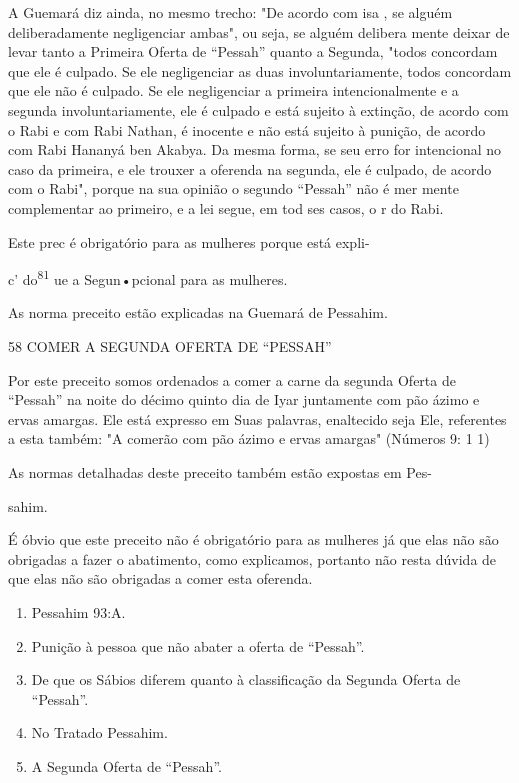 A Guemará diz ainda, no mesmo trecho: "De acordo com isa , se alguém
deliberadamente negligenciar ambas", ou seja, se alguém delibera mente
deixar de levar tanto a Primeira Oferta de ``Pessah'' quanto a Segunda,
"todos concordam que ele é culpado. Se ele negligenciar as duas
involuntaria­mente, todos concordam que ele não é culpado. Se ele
negligenciar a primeira intencionalmente e a segunda involuntariamente,
ele é culpado e está sujeito à extinção, de acordo com o Rabi e com Rabi
Nathan, é inocente e não está sujeito à punição, de acordo com Rabi
Hananyá ben Akabya. Da mesma forma, se seu erro for intencional no caso
da primeira, e ele trouxer a oferenda na se­gunda, ele é culpado, de
acordo com o Rabi", porque na sua opinião o segun­do ``Pessah'' não é mer
mente complementar ao primeiro, e a lei segue, em tod ses casos, o r do
Rabi.

Este prec é obrigatório para as mulheres porque está expli-

c' do\textsuperscript{81} ue a Segun•pcional para as mulheres.

As norma preceito estão explicadas na Guemará de Pessahim.

58 COMER A SEGUNDA OFERTA DE ``PESSAH''

Por este preceito somos ordenados a comer a carne da segunda Oferta de
``Pessah'' na noite do décimo quinto dia de Iyar juntamente com pão ázimo
e ervas amargas. Ele está expresso em Suas palavras, enaltecido seja
Ele, refe­rentes a esta também: "A comerão com pão ázimo e ervas
amargas" (Números 9: 1 1)


As normas detalhadas deste preceito também estão expostas em Pes-


sahim.

É óbvio que este preceito não é obrigatório para as mulheres já que elas
não são obrigadas a fazer o abatimento, como explicamos, portanto não
resta dúvida de que elas não são obrigadas a comer esta oferenda.


\begin{enumerate}
\def\labelenumi{\arabic{enumi}.}
\setcounter{enumi}{77}
\item
 
 Pessahim 93:A.
 
\item
 
 Punição à pessoa que não abater a oferta de ``Pessah''.
 
\item
 
 De que os Sábios diferem quanto à classificação da Segunda Oferta de
 ``Pessah''.
 
\item
 
 No Tratado Pessahim.
 
\item
 
 A Segunda Oferta de ``Pessah''.
 
\end{enumerate}



